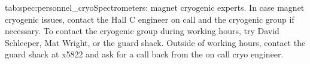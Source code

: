 \begin{namestab}{tab:spec:personnel_cryo}{Spectrometers: magnet cryogenic experts.}{%
    In case magnet cryogenic issues, contact the Hall C
    engineer on call and the cryogenic group if necessary.
    To contact the cryogenic group during working hours, try
    David Schleeper, Mat Wright, or the guard shack.  Outside of working hours, contact
    the guard shack at x5822 and ask for a call back from the on call cryo engineer.}
  \EngonCall{}
  \CryoonCall{}
\end{namestab}


%
%
